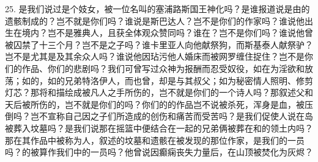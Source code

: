 25. 是我们说过是个妓女，被一位名叫的塞浦路斯国王神化吗？是谁报道说是由的遗骸制成的？岂不就是你们吗？谁说是斯巴达人？岂不是你们的作家吗？谁说他出生在境内？岂不是雅典人，且获全体观众赞同吗？谁在？岂不是你们吗？谁说他曾被囚禁了十三个月？岂不是之子吗？谁卡里亚人向他献祭狗，而斯基泰人献祭驴？岂不是尤其是及其余众人吗？谁说他因玷污他人婚床而被网罗缠住捉住？岂不是你们的作品、你们的悲剧吗？我们可曾写过众神为报酬而忍受奴役，如在为淫欲和放荡；如的，如的兄弟特洛伊人，而也曾，却是与其叔父；如为秘密情人照明、修剪灯芯？那将和描绘成被凡人之手所伤的，岂不就是你们的一个诗人吗？那叙述父和天后被所伤的，岂不就是你们的吗？你们的的作品岂不说被杀死，浑身是血，被压倒吗？岂不宣称自己因之子们所造成的创伤和痛苦而受苦吗？是我们促使人说在岛被葬入坟墓吗？是我们说那在摇篮中便结合在一起的兄弟俩被葬在和的领土内吗？那在其作品中被称为人，叙述的坟墓和遗骸在被发现的那位作家，是我们的一员吗？的被算作我们中的一员吗？他曾说因癫痫丧失力量后，在山顶被焚化为灰烬？\par

